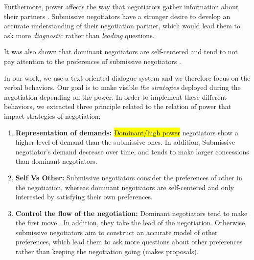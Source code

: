 \documentclass{llncs}
\begin{document}
	Furthermore, power affects the way that negotiators gather information about their partners \cite{de2004influence}. Submissive negotiators have a stronger desire to develop an accurate understanding of their negotiation partner, which would lead them to ask more \emph{diagnostic} rather than \emph{leading} questions.
	
	It was also shown that dominant negotiators are self-centered and tend to not pay attention to the preferences of submissive negotiators \cite{fiske1993controlling,de1995impact}.

	In our work, we use a text-oriented dialogue system and we therefore focus on the verbal behaviors.  Our goal is to make visible \emph{the strategies} deployed during the negotiation depending on the power. In order to implement these different behaviors, we extracted three principle related to the relation of power that impact strategies of negotiation:
	\begin{enumerate}
	\item \textbf{Representation of demands:} \hl{Dominant/high power} negotiators show a higher level of demand than the submissive ones. In addition,  Submissive negotiator's demand decrease over time, and tends to make larger concessions than dominant negotiators. \cite{de1995impact}
	
	\item \textbf{Self Vs Other:} Submissive negotiators consider the preferences of other in the negotiation, whereas dominant negotiators  are self-centered and only interested by satisfying their own preferences. \cite{fiske1993controlling,de1995impact}
	
	\item \textbf{Control the flow of the negotiation:}
	Dominant negotiators tend to make the first move \cite{magee2007power}. In addition, they take the lead of the negotiation. Otherwise, submissive negotiators aim to construct an accurate model of other preferences, which lead them to ask more questions about other preferences rather than keeping the negotiation going (makes proposals). \cite{de2004influence}
	
	\end{enumerate}
	
\end{document}

